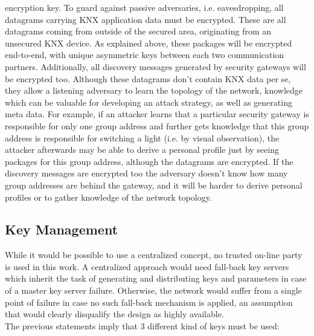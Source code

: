 encryption key.
To guard against passive adversaries, i.e. eavesdropping, all datagrams carrying KNX application data must be encrypted. These are all datagrams coming from outside of the
secured area, originating from an unsecured KNX device. As explained above, these packages will be encrypted end-to-end, with unique asymmetric keys between
each two communication partners.
Additionally, all discovery messages generated by security gateways will be encrypted too. Although these datagrams don't contain KNX data per se, they allow
a listening adversary to learn the topology of the network, knowledge which can be valuable for developing an attack strategy, as well as generating meta data.
For example, if an attacker learns that a particular security gateway is responsible for only one group address and further gets knowledge that this 
group address is responsible for switching a light (i.e. by visual observation), the attacker afterwards may be able to derive a personal profile just by seeing
packages for this group address, although the datagrams are encrypted. If the discovery messages are encrypted too the adversary doesn't know how many
group addresses are behind the gateway, and it will be harder to derive personal profiles or to gather knowledge of the network topology.

\subsection{Key Management}

While it would be possible to use a centralized concept, no trusted on-line party is used in this work. A centralized approach would need fall-back key servers
which inherit the task of generating and distributing keys and parameters in case of a master key server failure. Otherwise, the network would suffer from a
single point of failure in case no such fall-back mechanism is applied, an assumption that would clearly disqualify the design as highly available.
\\
The previous statements imply that 3 different kind of keys must be used:

